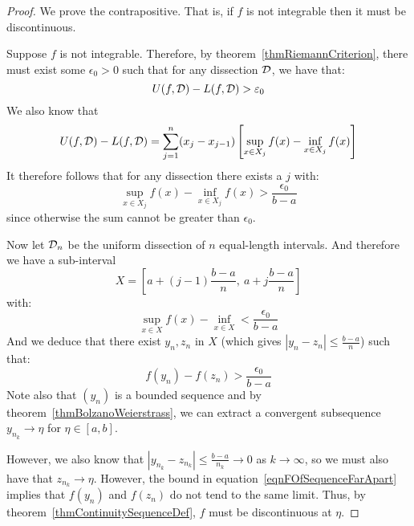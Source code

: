\documentclass[../Main.tex]{subfiles}
\begin{document}
\begin{proof}
    We prove the contrapositive. That is, if $f$ is not integrable then it must be discontinuous.

    Suppose $f$ is not integrable. Therefore, by theorem~\ref{thmRiemannCriterion}, there must exist some $\epsilon_0 > 0$ such that for any dissection $\mathcal{D}$, we have that:
    \begin{equation*}
        U(f, \mathcal{D}) - L(f, \mathcal{D}) > \varepsilon_0
    \end{equation*}
    We also know that
    \begin{equation*}
        U(f, \mathcal{D}) - L(f, \mathcal{D}) = \sum_{j = 1}^n (x_j - x_{j - 1})\left[\sup_{x \in X_j} f(x) - \inf_{x \in X_j} f(x)\right]
    \end{equation*}
    It therefore follows that for any dissection there exists a $j$ with:
    \begin{equation*}
        \sup_{x \in X_j} f(x) - \inf_{x \in X_j} f(x) > \frac{\epsilon_0}{b - a}
    \end{equation*}
    since otherwise the sum cannot be greater than $\epsilon_0$.

    Now let $\mathcal{D}_n$ be the uniform dissection of $n$ equal-length intervals. And therefore we have a sub-interval
    \begin{equation*}
        X = \left[a + (j - 1) \frac{b - a}{n},~a + j\frac{b-a}{n}\right]
    \end{equation*}
    with:
    \begin{equation*}
        \sup_{x \in X} f(x) - \inf_{x \in X} < \frac{\epsilon_0}{b - a}
    \end{equation*}
    And we deduce that there exist $y_n, z_n$ in $X$ (which gives $|y_n - z_n| \leq \frac{b - a}{n}$) such that:
    \begin{equation}
        f(y_n) - f(z_n) > \frac{\epsilon_0}{b - a}
        \label{eqnFOfSequenceFarApart}
    \end{equation}
    Note also that $(y_n)$ is a bounded sequence and by theorem~\ref{thmBolzanoWeierstrass}, we can extract a convergent subsequence $y_{n_k} \to \eta$ for $\eta \in [a, b]$.

    However, we also know that $|y_{n_k} - z_{n_k}| \leq \frac{b-a}{n_k} \to 0$ as $k \to \infty$, so we must also have that $z_{n_k} \to \eta$. However, the bound in equation~\ref{eqnFOfSequenceFarApart} implies that $f(y_n)$ and $f(z_n)$ do not tend to the same limit. Thus, by theorem~\ref{thmContinuitySequenceDef}, $f$ must be discontinuous at $\eta$.
\end{proof}
\end{document}
